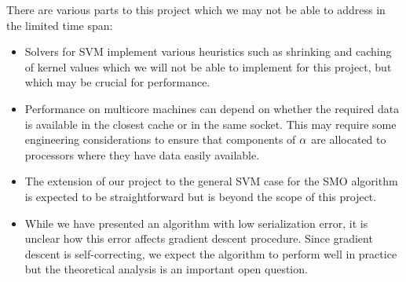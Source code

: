There are various parts to this project which we may not be able to address in the limited time span:
\begin{itemize}
\item Solvers for SVM implement various heuristics such as shrinking and caching of kernel values which we will not be able to implement for this project, but which may be crucial for performance.
\item Performance on multicore machines can depend on whether the required data is available in the closest cache or in the same socket. This may require some engineering considerations to ensure that components of $\alpha$ are allocated to processors where they have data easily available.
\item The extension of our project to the general SVM case for the SMO algorithm is expected to be straightforward but is beyond the scope of this project.
\item While we have presented an algorithm with low serialization error, it is unclear how this error affects gradient descent procedure. Since gradient descent is self-correcting, we expect the algorithm to perform well in practice but the theoretical analysis is an important open question.
\end{itemize}
